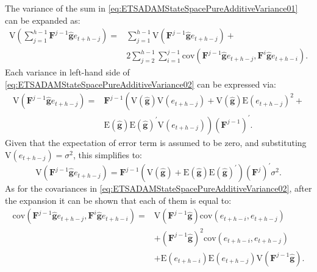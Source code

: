 \documentclass[
]{book}
\theoremstyle{definition}
\theoremstyle{definition}
\theoremstyle{definition}
\theoremstyle{definition}
\theoremstyle{remark}
\begin{document}
The variance of the sum in \eqref{eq:ETSADAMStateSpacePureAdditiveVariance01} can be expanded as:
\begin{equation}
    \begin{aligned}
    \mathrm{V} \left(\sum_{j=1}^{h-1} \mathbf{F}^{j-1} \hat{\mathbf{g}} e_{t+h-j} \right) = & \sum_{j=1}^{h-1} \mathrm{V} \left(\mathbf{F}^{j-1} \hat{\mathbf{g}} e_{t+h-j}\right) + \\
    & 2 \sum_{j=2}^{h-1} \sum_{i=1}^{j-1} \mathrm{cov}(\mathbf{F}^{j-1} \hat{\mathbf{g}} e_{t+h-j},\mathbf{F}^{i} \hat{\mathbf{g}} e_{t+h-i}).
    \end{aligned}
  \label{eq:ETSADAMStateSpacePureAdditiveVariance02}
\end{equation}
Each variance in left-hand side of \eqref{eq:ETSADAMStateSpacePureAdditiveVariance02} can be expressed via:
\begin{equation}
    \begin{aligned}
    \mathrm{V} \left(\mathbf{F}^{j-1} \hat{\mathbf{g}} e_{t+h-j}\right) = & \mathbf{F}^{j-1} \left( \mathrm{V} (\hat{\mathbf{g}}) \mathrm{V}(e_{t+h-j}) + \mathrm{V} (\hat{\mathbf{g}}) \mathrm{E}(e_{t+h-j})^2 + \right. \\
    & \left. \mathrm{E} (\hat{\mathbf{g}}) \mathrm{E} (\hat{\mathbf{g}})^\prime \mathrm{V}(e_{t+h-j})\right) (\mathbf{F}^{j-1})^\prime.
    \end{aligned}
  \label{eq:ETSADAMStateSpacePureAdditiveVariance03}
\end{equation}
Given that the expectation of error term is assumed to be zero, and substituting \(\mathrm{V}(e_{t+h-j})=\sigma^2\), this simplifies to:
\begin{equation}
    \mathrm{V} \left(\mathbf{F}^{j-1} \hat{\mathbf{g}} e_{t+h-j}\right) = \mathbf{F}^{j-1} \left( \mathrm{V} (\hat{\mathbf{g}}) + \mathrm{E} (\hat{\mathbf{g}}) \mathrm{E} (\hat{\mathbf{g}})^\prime \right) (\mathbf{F}^{j})^\prime \sigma^2.
  \label{eq:ETSADAMStateSpacePureAdditiveVariance04}
\end{equation}
As for the covariances in \eqref{eq:ETSADAMStateSpacePureAdditiveVariance02}, after the expansion it can be shown that each of them is equal to:
\begin{equation}
    \begin{aligned}
    \mathrm{cov}(\mathbf{F}^{j-1} \hat{\mathbf{g}} e_{t+h-j},\mathbf{F}^{i} \hat{\mathbf{g}} e_{t+h-i}) = & \mathrm{V}(\mathbf{F}^{j-1} \hat{\mathbf{g}}) \mathrm{cov}(e_{t+h-i},e_{t+h-j}) \\
     & + \left(\mathbf{F}^{j-1} \hat{\mathbf{g}}\right)^2 \mathrm{cov}(e_{t+h-i},e_{t+h-j}) \\
    & + \mathrm{E}(e_{t+h-i}) \mathrm{E}(e_{t+h-j}) \mathrm{V}(\mathbf{F}^{j-1} \hat{\mathbf{g}}).
    \end{aligned}
  \label{eq:ETSADAMStateSpacePureAdditiveVariance05}
\end{equation}
\end{document}

